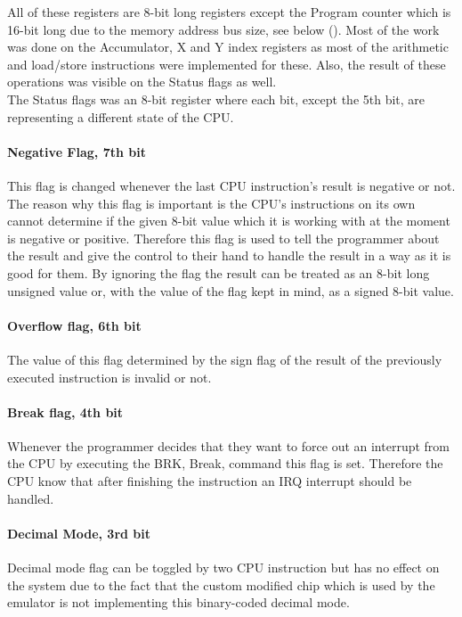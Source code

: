 \documentclass[]{report}
\begin{document}
All of these registers are 8-bit long registers except the Program counter which is 16-bit long due to the memory address bus size, see below (\cite{REG2}). Most of the work was done on the Accumulator, X and Y index registers
as most of the arithmetic and load/store instructions were implemented for these. Also, the result of these operations was visible on the Status flags as well. 
\\
The Status flags was an 8-bit register where each bit, except the 5th bit, are representing a different state of the CPU. 
\paragraph{Negative Flag, 7th bit}
This flag is changed whenever the last CPU instruction's result is negative or not. The reason why this flag is important is the CPU's instructions on its own cannot determine if the given 8-bit value which it is working with at the moment is negative or positive. Therefore this flag is used to tell the programmer about the result and give the control to their hand to handle the result in a way as it is good for them. By ignoring the flag the result can be treated as an 8-bit long unsigned value or, with the value of the flag kept in mind, as a signed 8-bit value.

\paragraph{Overflow flag, 6th bit}
The value of this flag determined by the sign flag of the result of the previously executed instruction is invalid or not.

\paragraph{Break flag, 4th bit}
Whenever the programmer decides that they want to force out an interrupt from the CPU by executing the BRK, Break, command this flag is set. Therefore the CPU know that after finishing the instruction an IRQ interrupt should be handled.

\paragraph{Decimal Mode, 3rd bit}
Decimal mode flag can be toggled by two CPU instruction but has no effect on the system due to the fact that the custom modified chip which is used by the emulator is not implementing this binary-coded decimal mode.
\end{document}
